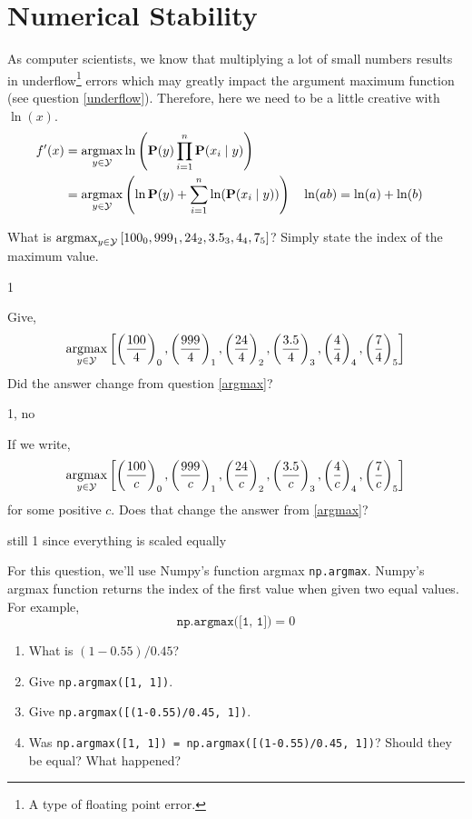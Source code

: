 \documentclass{homework}
\renewcommand\P{\mathbf{P}}
\newcommand\Y{\mathcal{Y}}
\DeclareMathOperator*{\argmax}{argmax}
\begin{document}
\section{Numerical Stability}
As computer scientists, we know that multiplying a lot of small
numbers results in underflow\footnote{A type of floating point error.}
errors which may greatly impact the argument maximum function (see
question \ref{underflow}). Therefore, here we need to be a little
creative with $\ln(x)$.
\begin{align*}
  f'(x)
   & = \argmax_{y\in \Y}
  \ln\paren{\P(y)\prod_{i=1}^n\P(x_i \mid y)} \\
   & = \argmax_{y\in \Y}
  \paren{\ln \P(y) + \sum_{i=1}^n\ln(\P(x_i \mid y))}
   &
   & \ln(ab) = \ln(a) + \ln(b)                \\
\end{align*}

\question\label{argmax} What is
$\argmax_{y\in \Y} \brk{100_0, 999_1, 24_2, 3.5_3, 4_4, 7_5}$? Simply
state the index of the maximum value.

\begin{sol}
  1
\end{sol}

\question\label{argmax1} Give,
\[
  \argmax_{y\in \Y} \brk{
    \paren{\frac{100}{4}}_0,
    \paren{\frac{999}{4}}_1,
    \paren{\frac{24}{4}}_2,
    \paren{\frac{3.5}{4}}_3,
    \paren{\frac{4}{4}}_4,
    \paren{\frac{7}{4}}_5
  }
\]
Did the answer change from question \ref{argmax}?

\begin{sol}
  1, no
\end{sol}

\question\label{argmax2} If we write,
\[
  \argmax_{y\in \Y}
  \brk{\paren{\frac{100}{c}}_0,
    \paren{\frac{999}{c}}_1,
    \paren{\frac{24}{c}}_2,
    \paren{\frac{3.5}{c}}_3,
    \paren{\frac{4}{c}}_4,
    \paren{\frac{7}{c}}_5
  }
\]
for some positive $c$. Does that change the answer from \ref{argmax}?

\begin{sol}
  still 1 since everything is scaled equally
\end{sol}

\question\label{underflow} For this question, we'll use Numpy's
function argmax \eg \texttt{np.argmax}. Numpy's argmax function
returns the index of the first value when given two equal values. For
example,
\[
  \texttt{np.argmax([1, 1])} = 0
\]
\begin{enumerate}
  \item What is $(1-0.55)/0.45$?
  \item Give \texttt{np.argmax([1, 1])}.
  \item Give \texttt{np.argmax([(1-0.55)/0.45, 1])}.
  \item Was \texttt{np.argmax([1, 1]) = np.argmax([(1-0.55)/0.45, 1])}?
        Should they be equal? What happened?
\end{enumerate}
\end{document}
